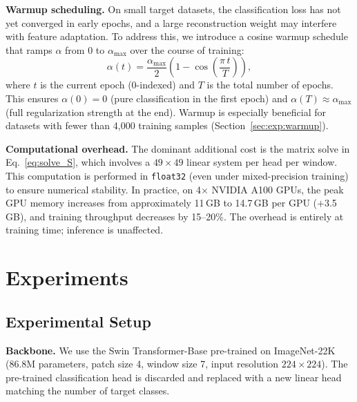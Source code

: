 \documentclass[review,12pt,authoryear]{elsarticle}
\begin{document}
\textbf{Warmup scheduling.}
On small target datasets, the classification loss has not yet converged in early epochs, and a large reconstruction weight may interfere with feature adaptation.
To address this, we introduce a cosine warmup schedule that ramps $\alpha$ from 0 to $\alpha_{\max}$ over the course of training:
\begin{equation}
    \alpha(t) = \frac{\alpha_{\max}}{2}\left(1 - \cos\!\left(\frac{\pi\, t}{T}\right)\right),
    \label{eq:warmup}
\end{equation}
where $t$ is the current epoch (0-indexed) and $T$ is the total number of epochs.
This ensures $\alpha(0) = 0$ (pure classification in the first epoch) and $\alpha(T) \approx \alpha_{\max}$ (full regularization strength at the end).
Warmup is especially beneficial for datasets with fewer than 4{,}000 training samples (Section~\ref{sec:exp:warmup}).

\textbf{Computational overhead.}
The dominant additional cost is the matrix solve in Eq.~\eqref{eq:solve_S}, which involves a $49 \times 49$ linear system per head per window.
This computation is performed in \texttt{float32} (even under mixed-precision training) to ensure numerical stability.
In practice, on 4$\times$ NVIDIA A100 GPUs, the peak GPU memory increases from approximately 11\,GB to 14.7\,GB per GPU ($+$3.5\,GB), and training throughput decreases by 15--20\%.
The overhead is entirely at training time; inference is unaffected.

\section{Experiments}
\label{sec:experiments}

\subsection{Experimental Setup}
\label{sec:exp:setup}

\textbf{Backbone.}
We use the Swin Transformer-Base \citep{liu2021swin} pre-trained on ImageNet-22K (86.8M parameters, patch size 4, window size 7, input resolution $224 \times 224$).
The pre-trained classification head is discarded and replaced with a new linear head matching the number of target classes.
\end{document}
